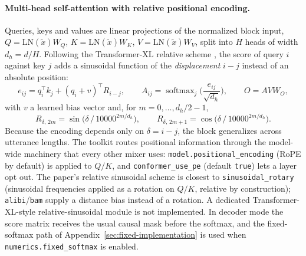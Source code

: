 \paragraph{Multi-head self-attention with relative positional encoding.} Queries, keys and values are linear projections of the normalized block input, $Q = \mathrm{LN}(\tilde{x})W_Q$, $K = \mathrm{LN}(\tilde{x})W_K$, $V = \mathrm{LN}(\tilde{x})W_V$, split into $H$ heads of width $d_h = d/H$. Following the Transformer-XL relative scheme \citep{Dai2019}, the score of query $i$ against key $j$ adds a sinusoidal function of the \emph{displacement} $i-j$ instead of an absolute position:
\begin{equation}
e_{ij} = q_i^{\top} k_j + (q_i + v)^{\top} R_{i-j},
\qquad
A_{ij} = \operatorname{softmax}_j\!\Big(\frac{e_{ij}}{\sqrt{d_h}}\Big),
\qquad
O = A V W_O,
\label{eq:conformer-relpe}
\end{equation}
with $v$ a learned bias vector and, for $m = 0, \dots, d_h/2 - 1$,
\begin{equation}
R_{\delta,\,2m} = \sin\!\big(\delta\,/\,10000^{2m/d_h}\big),
\qquad
R_{\delta,\,2m+1} = \cos\!\big(\delta\,/\,10000^{2m/d_h}\big).
\label{eq:conformer-sinusoid}
\end{equation}
Because the encoding depends only on $\delta = i-j$, the block generalizes across utterance lengths. The toolkit routes positional information through the model-wide machinery that every other mixer uses: \texttt{model.positional\_encoding} (RoPE by default) is applied to $Q/K$, and \texttt{conformer\_use\_pe} (default \texttt{true}) lets a layer opt out. The paper's relative sinusoidal scheme is closest to \texttt{sinusoidal\_rotary} (sinusoidal frequencies applied as a rotation on $Q/K$, relative by construction); \texttt{alibi}/\texttt{bam} supply a distance bias instead of a rotation. A dedicated Transformer-XL-style relative-sinusoidal module is not implemented. In decoder mode the score matrix receives the usual causal mask before the softmax, and the fixed-softmax path of Appendix~\ref{sec:fixed-implementation} is used when \texttt{numerics.fixed\_softmax} is enabled.

